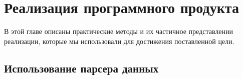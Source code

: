 \chapter{Реализация программного продукта}

В этой главе описаны практические методы и их частичное представлении реализации, 
которые мы использовали для достижения поставленной цели.

\section{Использование парсера данных}